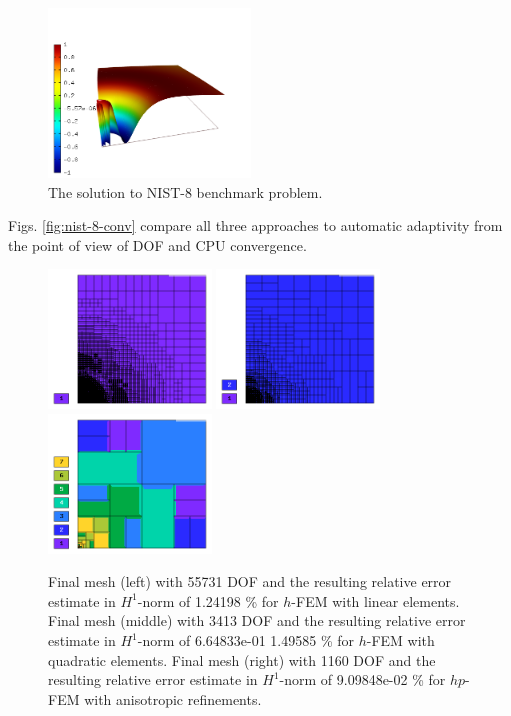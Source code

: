 \documentclass[12pt]{elsarticle}
\begin{document}
\begin{figure}[H]
\centering
\includegraphics[height=4.5cm]{nist/nist-8/solution.png}
\caption{The solution to NIST-8 benchmark problem.}
\label{fig:sln-nist08}
\end{figure}

Figs. \ref{fig:nist-8-conv} compare all
three approaches to automatic adaptivity from the point
of view of DOF and CPU convergence.

\begin{figure}[H]
\centering
\includegraphics[height=3.7cm]{nist/nist-8/mesh_h1_aniso.png}
\includegraphics[height=3.7cm]{nist/nist-8/mesh_h2_aniso.png}
\includegraphics[height=3.7cm]{nist/nist-8/mesh_hp_aniso.png}
\vspace{-3mm}
\caption{
Final mesh (left) with 55731 DOF and the resulting
relative error estimate in $H^1$-norm of 1.24198 \% for $h$-FEM with linear elements.
Final mesh (middle) with 3413 DOF and the resulting
relative error estimate in $H^1$-norm of 6.64833e-01 1.49585 \% for $h$-FEM with quadratic elements.
Final mesh (right) with 1160 DOF and the resulting
relative error estimate in $H^1$-norm of 9.09848e-02 \% for $hp$-FEM with anisotropic refinements.}
\label{fig:nist-8-hp-aniso}
\end{figure}
\end{document}
